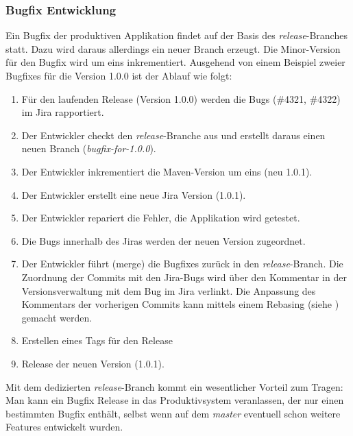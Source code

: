 \subsubsection{Bugfix Entwicklung}
Ein Bugfix der produktiven Applikation findet auf der Basis des \textit{release}-Branches statt. Dazu wird daraus allerdings ein neuer Branch erzeugt. Die Minor-Version für den Bugfix wird um eins inkrementiert. Ausgehend von einem Beispiel zweier Bugfixes für die Version 1.0.0 ist der Ablauf wie folgt:
\begin{enumerate}
\item Für den laufenden Release (Version 1.0.0) werden die Bugs (\#4321, \#4322) im Jira rapportiert.
\item Der Entwickler checkt den \textit{release}-Branche aus und erstellt daraus einen neuen Branch (\textit{bugfix-for-1.0.0}).
\item Der Entwickler inkrementiert die Maven-Version um eins (neu 1.0.1).
\item Der Entwickler erstellt eine neue Jira Version (1.0.1).
\item Der Entwickler repariert die Fehler, die Applikation wird getestet.
\item Die Bugs innerhalb des Jiras werden der neuen Version zugeordnet.
\item Der Entwickler führt (merge) die Bugfixes zurück in den \textit{release}-Branch. Die Zuordnung der Commits mit den Jira-Bugs wird über den Kommentar in der Versionsverwaltung mit dem Bug im Jira verlinkt. Die Anpassung des Kommentars der vorherigen Commits kann mittels einem Rebasing (siehe \cite{dilger201111}) gemacht werden.
\item Erstellen eines Tags für den Release
\item Release der neuen Version (1.0.1).
\end{enumerate}
Mit dem dedizierten \textit{release}-Branch kommt ein wesentlicher Vorteil zum Tragen: Man kann ein Bugfix Release in das Produktivsystem veranlassen, der nur einen bestimmten Bugfix enthält, selbst wenn auf dem \textit{master} eventuell schon weitere Features entwickelt wurden.

